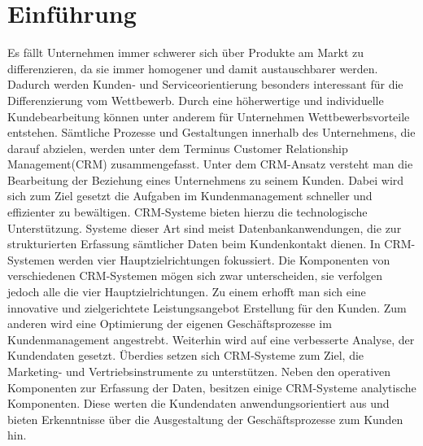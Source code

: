 
\chapter{Einführung}

Es fällt Unternehmen immer schwerer sich über Produkte am Markt zu differenzieren, da sie immer homogener und damit austauschbarer werden. Dadurch werden Kunden- und Serviceorientierung besonders interessant für die Differenzierung vom Wettbewerb. Durch eine höherwertige und individuelle Kundebearbeitung können unter anderem für Unternehmen Wettbewerbsvorteile entstehen. Sämtliche Prozesse und Gestaltungen innerhalb des Unternehmens, die darauf abzielen, werden unter dem Terminus Customer Relationship Management(CRM) zusammengefasst. Unter dem CRM-Ansatz versteht man die Bearbeitung der Beziehung eines Unternehmens zu seinem Kunden. Dabei wird sich zum Ziel gesetzt die Aufgaben im Kundenmanagement schneller und effizienter zu bewältigen. CRM-Systeme bieten hierzu die technologische Unterstützung. Systeme dieser Art sind meist Datenbankanwendungen, die zur strukturierten Erfassung sämtlicher Daten beim Kundenkontakt dienen. In CRM-Systemen werden vier Hauptzielrichtungen fokussiert. Die Komponenten von verschiedenen CRM-Systemen mögen sich zwar unterscheiden, sie verfolgen jedoch alle die vier Hauptzielrichtungen. Zu einem erhofft man sich eine innovative und zielgerichtete Leistungsangebot Erstellung für den Kunden. Zum anderen wird eine Optimierung der eigenen Geschäftsprozesse im Kundenmanagement angestrebt. Weiterhin wird auf eine verbesserte Analyse, der Kundendaten gesetzt. Überdies setzen sich CRM-Systeme zum Ziel, die Marketing- und Vertriebsinstrumente zu unterstützen. Neben den operativen Komponenten zur Erfassung der Daten, besitzen einige CRM-Systeme analytische Komponenten. Diese werten die Kundendaten anwendungsorientiert aus und bieten Erkenntnisse über die Ausgestaltung der Geschäftsprozesse zum Kunden hin.

